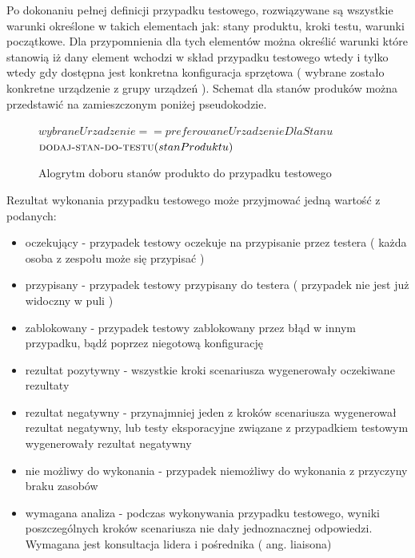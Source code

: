Po dokonaniu pełnej definicji przypadku testowego, rozwiązywane są wszystkie warunki określone w takich elementach jak: stany produktu, kroki testu, warunki początkowe. Dla przypomnienia dla tych elementów można określić warunki które stanowią iż dany element wchodzi w skład przypadku testowego wtedy i tylko wtedy gdy dostępna jest konkretna konfiguracja sprzętowa ( wybrane zostało konkretne urządzenie z grupy urządzeń ). Schemat dla stanów produków można przedstawić na zamieszczonym poniżej pseudokodzie.
\begin{figure}
	\begin{codebox}
	\li {}
	\li \Do   
	\li \Do
	     \If $wybraneUrzadzenie  ==  preferowaneUrzadzenieDlaStanu$
	\li     \Then
	           $\textnormal{\scshape dodaj-stan-do-testu}(stanProduktu)$	         	         
	        \End	        
	\li  \End	 
	\li
	  \End
	  
	\end{codebox}
	\caption{ Alogrytm doboru stanów produkto do przypadku testowego }
\end{figure}


Rezultat wykonania przypadku testowego może przyjmować jedną wartość z podanych:
\begin{itemize}
   \item oczekujący - przypadek testowy oczekuje na przypisanie przez testera ( każda osoba z zespołu może się przypisać )
   \item przypisany - przypadek testowy przypisany do testera ( przypadek nie jest już widoczny w puli )
   \item zablokowany - przypadek testowy zablokowany przez błąd w innym przypadku, bądź poprzez niegotową konfigurację
   \item rezultat pozytywny - wszystkie kroki scenariusza wygenerowały oczekiwane rezultaty
   \item rezultat negatywny - przynajmniej jeden z kroków scenariusza wygenerował rezultat negatywny, lub testy eksporacyjne związane z przypadkiem testowym wygenerowały rezultat negatywny
   \item nie możliwy do wykonania - przypadek niemożliwy do wykonania z przyczyny braku zasobów
   \item wymagana analiza - podczas wykonywania przypadku testowego, wyniki poszczególnych kroków scenariusza nie dały jednoznacznej odpowiedzi. Wymagana jest konsultacja lidera i pośrednika ( ang. liaisona)
 \end{itemize} 

